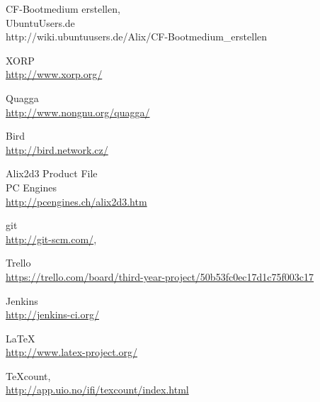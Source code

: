 \documentclass[12pt]{report}
\begin{document}
\begin{thebibliography}{9}
	CF-Bootmedium erstellen,\\
	UbuntuUsers.de\\
	http://wiki.ubuntuusers.de/Alix/CF-Bootmedium\_erstellen


	XORP\\
	\url{http://www.xorp.org/}

	Quagga\\
	\url{http://www.nongnu.org/quagga/}

	Bird\\
	\url{http://bird.network.cz/}


	Alix2d3 Product File\\
	PC Engines\\
	\url{http://pcengines.ch/alix2d3.htm}


	git \\
	\url{http://git-scm.com/},

	Trello \\
	\url{https://trello.com/board/third-year-project/50b53fc0ec17d1c75f003c17}

	Jenkins\\
	\url{http://jenkins-ci.org/}

	\LaTeX \\
	\url{http://www.latex-project.org/}

	TeXcount,\\
	\url{http://app.uio.no/ifi/texcount/index.html}

\end{thebibliography}
\end{document}
